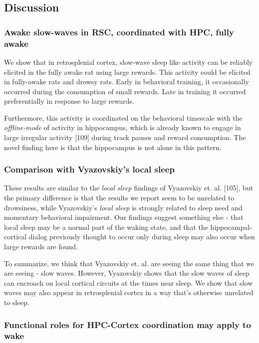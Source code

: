 \documentclass[]{article}
\begin{document}
\subsection{Discussion}

\subsubsection{Awake slow-waves in RSC, coordinated with HPC, fully
awake}

We show that in retrosplenial cortex, slow-wave sleep like activity can
be reliably elicited in the fully awake rat using large rewards. This
activity could be elicited in fully-awake rats and drowsy rats. Early in
behavioral training, it occasionally occurred during the consumption of
small rewards. Late in training it occurred preferentially in response
to large rewards.

Furthermore, this activity is coordinated on the behavioral timescale
with the \emph{offline-mode} of activity in hippocampus, which is
already known to engage in large irregular activity {[}109{]} during
track pauses and reward consumption. The novel finding here is that the
hippocampus is not alone in this pattern.

\subsubsection{Comparison with Vyazovskiy's local sleep}

These results are similar to the \emph{local sleep} findings of
Vyazovskiy et. al. {[}105{]}, but the primary difference is that the
results we report seem to be unrelated to drowsiness, while Vyazovskiy's
\emph{local sleep} is strongly related to sleep need and momentary
behavioral impairment. Our findings suggest something else - that local
sleep may be a normal part of the waking state, and that the
hippocampal-cortical dialog previously thought to occur only during
sleep may also occur when large rewards are found.

To summarize, we think that Vyazovskiy et. al. are seeing the same thing
that we are seeing - slow waves. However, Vyazovskiy shows that the slow
waves of sleep can encroach on local cortical circuits at the times near
sleep. We show that slow waves may also appear in retrosplenial cortex
in a way that's otherwise unrelated to sleep.

\subsubsection{Functional roles for HPC-Cortex coordination may apply to
wake}
\end{document}
